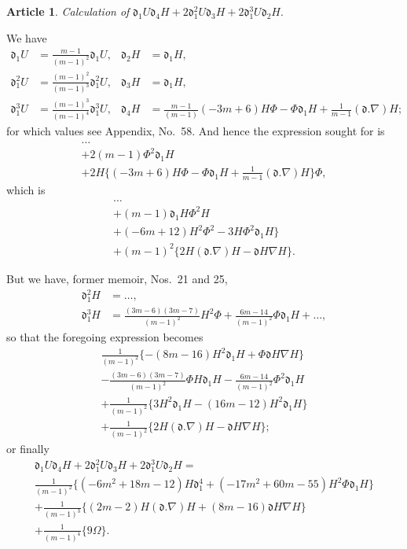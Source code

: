 \documentclass[12pt,a4paper]{article}
\theoremstyle{definition}
\newtheorem{art}{Article}[section]
\begin{document}
\begin{art}
\textit{Calculation of} $\mathfrak{d}_1 U\mathfrak{d}_4 H + 2\mathfrak{d}_1^2 U\mathfrak{d}_3 H + 2\mathfrak{d}_1^3 U\mathfrak{d}_2 H$.

We have
\begin{align*}
\mathfrak{d}_1 U &= \frac{m - 1}{(m - 1)^2}\mathfrak{d}_1 U, & \mathfrak{d}_2 H &= \mathfrak{d}_1 H, \\
\mathfrak{d}_1^2 U &= \frac{(m - 1)^2}{(m - 1)^3}\mathfrak{d}_1^2 U, & \mathfrak{d}_3 H &= \mathfrak{d}_1 H, \\
\mathfrak{d}_1^3 U &= \frac{(m - 1)^3}{(m - 1)^4}\mathfrak{d}_1^3 U, & \mathfrak{d}_4 H &= \frac{m - 1}{(m - 1)}(-3m + 6)H\Phi - \Phi\mathfrak{d}_1 H + \frac{1}{m - 1}(\mathfrak{d}.\nabla)H;
\end{align*}
for which values see Appendix, No.~58. And hence the expression sought for is
\begin{multline*}
\ldots \\
+ 2(m - 1)\Phi^2\mathfrak{d}_1 H \\
+ 2H\{(-3m + 6)H\Phi - \Phi\mathfrak{d}_1 H + \frac{1}{m - 1}(\mathfrak{d}.\nabla)H\}\Phi,
\end{multline*}
which is
\begin{multline*}
\ldots \\
+ (m - 1)\mathfrak{d}_1 H\Phi^2 H \\
+ (-6m + 12)H^2\Phi^2 - 3H\Phi^2\mathfrak{d}_1 H\} \\
+ (m - 1)^2\{2H(\mathfrak{d}.\nabla)H - \mathfrak{d}H\nabla H\}.
\end{multline*}

But we have, former memoir, Nos.\ 21 and 25,
\begin{align*}
\mathfrak{d}_1^2 H &= \ldots, \\
\mathfrak{d}_1^3 H &= \frac{(3m - 6)(3m - 7)}{(m - 1)^2}H^2\Phi + \frac{6m - 14}{(m - 1)^2}\Phi\mathfrak{d}_1 H + \ldots,
\end{align*}
so that the foregoing expression becomes
\begin{multline*}
\frac{1}{(m - 1)^2}\{-(8m - 16)H^2\mathfrak{d}_1 H + \Phi\mathfrak{d}H\nabla H\} \\
- \frac{(3m - 6)(3m - 7)}{(m - 1)^2}\Phi H\mathfrak{d}_1 H - \frac{6m - 14}{(m - 1)^2}\Phi^2\mathfrak{d}_1 H \\
+ \frac{1}{(m - 1)^2}\{3H^2\mathfrak{d}_1 H - (16m - 12)H^2\mathfrak{d}_1 H\} \\
+ \frac{1}{(m - 1)^2}\{2H(\mathfrak{d}.\nabla)H - \mathfrak{d}H\nabla H\};
\end{multline*}
or finally
\begin{multline*}
\mathfrak{d}_1 U\mathfrak{d}_4 H + 2\mathfrak{d}_1^2 U\mathfrak{d}_3 H + 2\mathfrak{d}_1^3 U\mathfrak{d}_2 H = \\
\frac{1}{(m - 1)^2}\{(-6m^2 + 18m - 12)H\mathfrak{d}_1^4 + (-17m^2 + 60m - 55)H^2\Phi\mathfrak{d}_1 H\} \\
+ \frac{1}{(m - 1)^3}\{(2m - 2)H(\mathfrak{d}.\nabla)H + (8m - 16)\mathfrak{d}H\nabla H\} \\
+ \frac{1}{(m - 1)^4}\{9\Omega\}.
\end{multline*}
\end{art}
\end{document}
